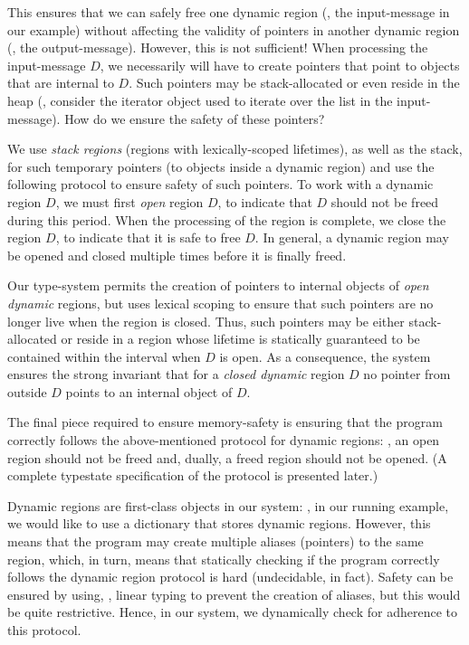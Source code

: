 This ensures that we can safely free one dynamic region (\eg, the input-message in our example)
without affecting the validity of pointers in another dynamic region (\eg, the output-message).
However, this is not sufficient! When processing the input-message $D$, we necessarily will have to create
pointers that point to objects that are internal to $D$. Such pointers may be stack-allocated or even reside
in the heap (\eg, consider the iterator object used to iterate over the list in the input-message).
How do we ensure the safety of these pointers?

We use \emph{stack regions} (regions with lexically-scoped lifetimes), as well as the stack,
for such temporary pointers (to objects inside a dynamic region) and use the following protocol
to ensure safety of such pointers.
To work with a dynamic region $D$, we must first \emph{open} region $D$,
to indicate that $D$ should not be freed during this period.
When the processing of the region is complete, we close the region $D$,
to indicate that it is safe to free $D$.
In general, a dynamic region may be opened and closed multiple times before it is finally freed.

Our type-system permits the creation of pointers to internal objects of \emph{open dynamic} regions,
but uses lexical scoping to ensure that such pointers are no longer live when the region is closed.
Thus, such pointers may be either stack-allocated or reside in a region whose lifetime is statically
guaranteed to be contained within the interval when $D$ is open.
As a consequence, the system ensures the strong invariant that for a \emph{closed dynamic} region $D$
no pointer from outside $D$ points to an internal object of $D$.

The final piece required to ensure memory-safety is ensuring that the program correctly follows the above-mentioned
protocol for dynamic regions: \eg, an open region should not be freed and, dually, a freed region should not be opened.
(A complete typestate specification of the protocol is presented later.)

Dynamic regions are first-class objects in our system: \eg, in our running example,
we would like to use a dictionary that stores dynamic regions. However, this means that the program may create multiple
aliases (pointers) to the same region, which, in turn, means that statically checking if the program correctly follows the
dynamic region protocol is hard (undecidable, in fact). Safety can be ensured by using, \eg, linear typing to prevent the
creation of aliases, but this would be quite restrictive. Hence, in our system, we dynamically check for adherence to
this protocol.

